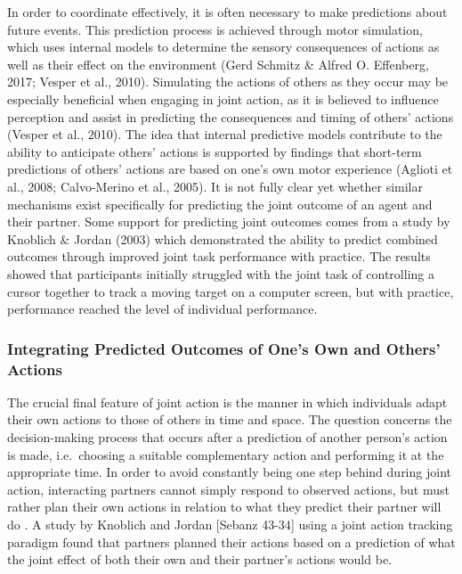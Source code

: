 \documentclass[10pt,a4paper,onecolumn]{article}
\begin{document}
In order to coordinate effectively, it is often necessary to make predictions about future events. This prediction process is achieved through motor simulation, which uses internal models to determine the sensory consequences of actions as well as their effect on the environment (Gerd Schmitz \& Alfred O. Effenberg, 2017; Vesper et al., 2010). Simulating the actions of others as they occur may be especially beneficial when engaging in joint action, as it is believed to influence perception and assist in predicting the consequences and timing of others' actions (Vesper et al., 2010). The idea that internal predictive models contribute to the ability to anticipate others' actions is supported by findings that short-term predictions of others' actions are based on one's own motor experience (Aglioti et al., 2008; Calvo-Merino et al., 2005). It is not fully clear yet whether similar mechanisms exist specifically for predicting the joint outcome of an agent and their partner. Some support for predicting joint outcomes comes from a study by Knoblich \& Jordan (2003) which demonstrated the ability to predict combined outcomes through improved joint task performance with practice. The results showed that participants initially struggled with the joint task of controlling a cursor together to track a moving target on a computer screen, but with practice, performance reached the level of individual performance.

\hypertarget{integrating-predicted-outcomes-of-ones-own-and-others-actions}{%
\subsubsection{Integrating Predicted Outcomes of One's Own and Others' Actions}\label{integrating-predicted-outcomes-of-ones-own-and-others-actions}}

The crucial final feature of joint action is the manner in which individuals adapt their own actions to those of others in time and space. The question concerns the decision-making process that occurs after a prediction of another person's action is made, i.e.~choosing a suitable complementary action and performing it at the appropriate time. In order to avoid constantly being one step behind during joint action, interacting partners cannot simply respond to observed actions, but must rather plan their own actions in relation to what they predict their partner will do \autocite{sebanzJointActionBodies2006}. A study by Knoblich and Jordan {[}Sebanz 43-34{]} using a joint action tracking paradigm found that partners planned their actions based on a prediction of what the joint effect of both their own and their partner's actions would be.
\end{document}
